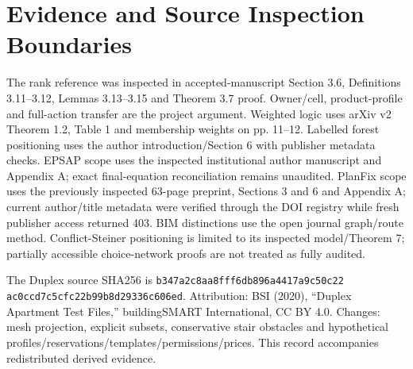 \documentclass[conference]{IEEEtran}
\begin{document}
\section{Evidence and Source Inspection Boundaries}
The rank reference was inspected in accepted-manuscript Section 3.6, Definitions 3.11--3.12, Lemmas 3.13--3.15 and Theorem 3.7 proof. Owner/cell, product-profile and full-action transfer are the project argument. Weighted logic uses arXiv v2 Theorem 1.2, Table 1 and membership weights on pp. 11--12. Labelled forest positioning uses the author introduction/Section 6 with publisher metadata checks. EPSAP scope uses the inspected institutional author manuscript and Appendix A; exact final-equation reconciliation remains unaudited. PlanFix scope uses the previously inspected 63-page preprint, Sections 3 and 6 and Appendix A; current author/title metadata were verified through the DOI registry while fresh publisher access returned 403. BIM distinctions use the open journal graph/route method. Conflict-Steiner positioning is limited to its inspected model/Theorem 7; partially accessible choice-network proofs are not treated as fully audited.

The Duplex source SHA256 is \texttt{b347a2c8aa8fff6db896a4417a9c50c22} \texttt{ac0ccd7c5cfc22b99b8d29336c606ed}. Attribution: BSI (2020), ``Duplex Apartment Test Files,'' buildingSMART International, CC BY 4.0. Changes: mesh projection, explicit subsets, conservative stair obstacles and hypothetical profiles/reservations/templates/permissions/prices. This record accompanies redistributed derived evidence.
\end{document}
